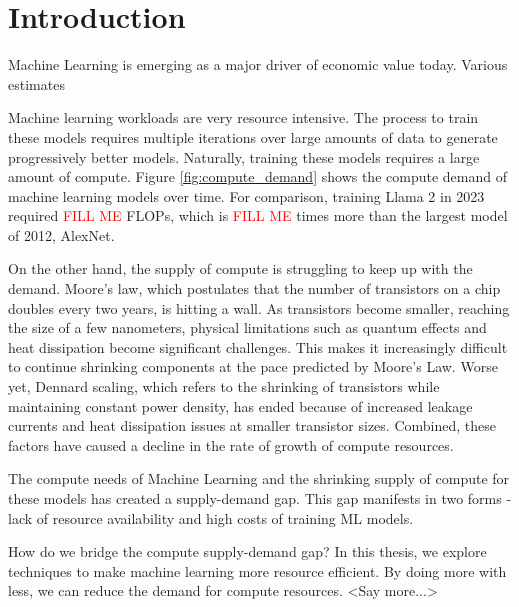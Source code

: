 \chapter{Introduction}
\label{ch_intro}

\newcommand{\fillme}{\textcolor{red}{FILL ME}}

Machine Learning is emerging as a major driver of economic value today. Various estimates 

Machine learning workloads are very resource intensive. The process to train these models requires multiple iterations over large amounts of data to generate progressively better models. Naturally, training these models requires a large amount of compute. Figure \ref{fig:compute_demand} shows the compute demand of machine learning models over time. For comparison, training Llama 2 in 2023 required \fillme{} FLOPs, which is \fillme{} times more than the largest model of 2012, AlexNet.

% 
On the other hand, the supply of compute is struggling to keep up with the demand. Moore's law, which postulates that the number of transistors on a chip doubles every two years, is hitting a wall. As transistors become smaller, reaching the size of a few nanometers, physical limitations such as quantum effects and heat dissipation become significant challenges. This makes it increasingly difficult to continue shrinking components at the pace predicted by Moore's Law. Worse yet, Dennard scaling, which refers to the shrinking of transistors while maintaining constant power density, has ended because of increased leakage currents and heat dissipation issues at smaller transistor sizes. 
Combined, these factors have caused a decline in the rate of growth of compute resources.

The compute needs of Machine Learning and the shrinking supply of compute for these models has created a supply-demand gap. This gap manifests in two forms - lack of resource availability and high costs of training ML models. 

How do we bridge the compute supply-demand gap? In this thesis, we explore techniques to make machine learning more resource efficient. By doing more with less, we can reduce the demand for compute resources. <Say more...>


